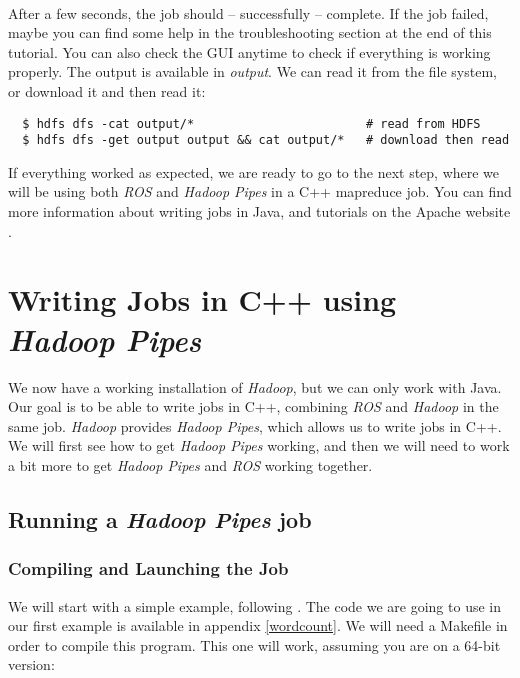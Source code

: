 \documentclass[a4paper, 12pt]{article}
\begin{document}
~\\
After a few seconds, the job should -- successfully -- complete. If the job failed, maybe you can find some help in the troubleshooting section at the end of this tutorial. You can also check the GUI anytime to check if everything is working properly. The output is available in \textit{output}. We can read it from the file system, or download it and then read it:

\begin{verbatim}
  $ hdfs dfs -cat output/*                        # read from HDFS
  $ hdfs dfs -get output output && cat output/*   # download then read
\end{verbatim}

If everything worked as expected, we are ready to go to the next step, where we will be using both \textit{ROS} and \textit{Hadoop Pipes} in a C++ mapreduce job. You can find more information about writing jobs in Java, and tutorials on the Apache website \cite{hadoop_mapreduce_tutorial}.

\section{Writing Jobs in C++ using \textit{Hadoop Pipes}}

We now have a working installation of \textit{Hadoop}, but we can only work with Java. Our goal is to be able to write jobs in C++, combining \textit{ROS} and \textit{Hadoop} in the same job. \textit{Hadoop} provides \textit{Hadoop Pipes}, which allows us to write jobs in C++. We will first see how to get \textit{Hadoop Pipes} working, and then we will need to work a bit more to get \textit{Hadoop Pipes} and \textit{ROS} working together.

  \subsection{Running a \textit{Hadoop Pipes} job}
  
    \subsubsection{Compiling and Launching the Job}

We will start with a simple example, following \cite{smith_pipes}. The code we are going to use in our first example is available in appendix \ref{wordcount}. We will need a Makefile in order to compile this program. This one will work, assuming you are on a 64-bit version:
\end{document}

